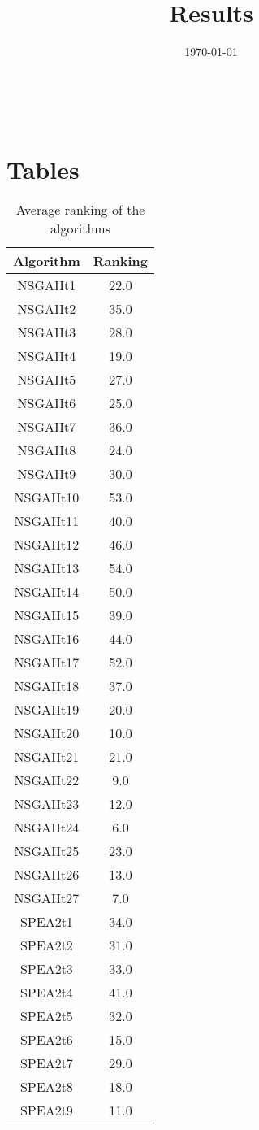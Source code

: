 \documentclass{article}
\title{Results}
\author{}
\date{\today}
\begin{document}
\oddsidemargin 0in \topmargin 0in\maketitle
\
\section{Tables}
\begin{table}[!htp]
\centering
\caption{Average ranking of the algorithms}
\begin{tabular}{c|c}
Algorithm&Ranking\\
\hline
NSGAIIt1&22.0\\
NSGAIIt2&35.0\\
NSGAIIt3&28.0\\
NSGAIIt4&19.0\\
NSGAIIt5&27.0\\
NSGAIIt6&25.0\\
NSGAIIt7&36.0\\
NSGAIIt8&24.0\\
NSGAIIt9&30.0\\
NSGAIIt10&53.0\\
NSGAIIt11&40.0\\
NSGAIIt12&46.0\\
NSGAIIt13&54.0\\
NSGAIIt14&50.0\\
NSGAIIt15&39.0\\
NSGAIIt16&44.0\\
NSGAIIt17&52.0\\
NSGAIIt18&37.0\\
NSGAIIt19&20.0\\
NSGAIIt20&10.0\\
NSGAIIt21&21.0\\
NSGAIIt22&9.0\\
NSGAIIt23&12.0\\
NSGAIIt24&6.0\\
NSGAIIt25&23.0\\
NSGAIIt26&13.0\\
NSGAIIt27&7.0\\
SPEA2t1&34.0\\
SPEA2t2&31.0\\
SPEA2t3&33.0\\
SPEA2t4&41.0\\
SPEA2t5&32.0\\
SPEA2t6&15.0\\
SPEA2t7&29.0\\
SPEA2t8&18.0\\
SPEA2t9&11.0\\

\end{tabular}
\end{table}
\end{document}
